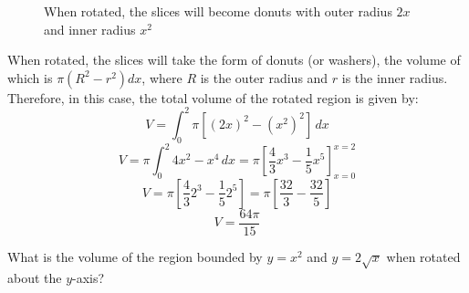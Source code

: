 \begin{figure}[htbp]
    \centering
    \caption{When rotated, the slices will become donuts with outer radius $2x$
    and inner radius $x^2$}
    \label{fig:donut}
\end{figure}
When rotated, the slices will take the form of donuts (or washers), the volume 
of which is $\pi \left( R^2 - r^2 \right) dx$, where $R$ is the outer radius 
and $r$ is the inner radius. Therefore, in this case, the total volume of the 
rotated region is given by:
$$V = \int_0^2 \pi \left[ \left( 2x \right)^2 - \left(x^2 \right)^2 \right]\,
dx$$
$$V = \pi \int_0^2 4x^2 - x^4\,dx = \pi \left[\frac{4}{3}x^3 - \frac{1}{5}x^5 
\right]_{x = 0}^{x = 2}$$
$$V = \pi \left[\frac{4}{3}2^3 - \frac{1}{5}2^5 \right] = \pi \left[ \frac{32}{
3} - \frac{32}{5} \right] $$
$$V = \frac{64 \pi}{15} $$

\begin{Exercise}[label = volume2]
What is the volume of the region bounded by $y = x^2$ and $y = 2\sqrt{x}$ when 
rotated about the $y$-axis? 
\vspace{75mm}
\end{Exercise}

